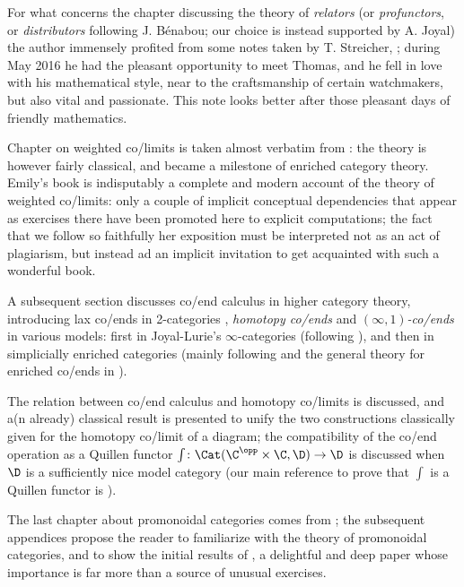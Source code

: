 For what concerns the chapter discussing the theory of \emph{relators} (or \emph{profunctors}, or \emph{distributors} following J\@. Bénabou; our choice is instead supported by A\@. Joyal) the author immensely profited from some notes taken by T\@. Streicher, \cite{benabou2000distributors}; during May 2016 he had the pleasant opportunity to meet Thomas, and he fell in love with his mathematical style, near to the craftsmanship of certain watchmakers, but also vital and passionate. This note looks better after those pleasant days of friendly mathematics.

Chapter  on weighted co/limits is taken almost verbatim from \cite[\textbf{II.7}]{riehl2014categorical}: the theory is however fairly classical, and became a milestone of enriched category theory. Emily's book is indisputably a complete and modern account of the theory of weighted co/limits: only a couple of implicit conceptual dependencies that appear as exercises there have been promoted here to explicit computations; the fact that we follow so faithfully her exposition must be interpreted not as an act of plagiarism, but instead ad an implicit invitation to get acquainted with such a wonderful book.

A subsequent section discusses co/end calculus in higher category theory, introducing lax co/ends in 2\hyp{}categories \cite{bozapalides1977finsgen,bozapalides1975fins,bozapalides1980some}, \emph{homotopy co/ends} \cite{DrorFar98,Isaacson} and \emph{$(\infty,1)$\hyp{}co/ends} in various models: first in Joyal\hyp{}Lurie's $\infty$\hyp{}categories (following \cite{gepner2015lax}), and then in simplicially enriched categories (mainly following \cite{cordier1997homotopy} and the general theory for enriched co/ends in \cite{dubuc1970kan,Graya}).

The relation between co/end calculus and homotopy co/limits is discussed, and a(n already) classical result \cite{Gamb} is presented to unify the two constructions classically given for the homotopy co/limit of a diagram; the compatibility of the co/end operation as a Quillen functor $\int\colon \Cat(\C^\opp\times\C,\D)\to \D$ is discussed when $\D$ is a sufficiently nice model category (our main reference to prove that $\int$ is a Quillen functor is \cite[\textbf{A.2.9.28}]{HTT}).

The last chapter about promonoidal categories comes from \cite{day1974embedding, street2012monoidal}; the subsequent appendices propose the reader to familiarize with the theory of promonoidal categories, and to show the initial results of \cite[\S \textbf{1}-\textbf{3}]{day2011monoidal}, a delightful and deep paper whose importance is far more than a source of unusual exercises.

